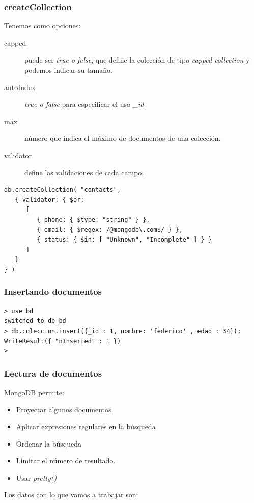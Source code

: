 \documentclass[4paper]{article}
\begin{document}
\subsubsection{createCollection}
Tenemos como opciones:
\begin{description}
\item[capped] puede ser \emph{true o false}, que define la colección de tipo \emph{capped collection} y podemos indicar su tamaño.
\item[autoIndex] \emph{true o false} para especificar el uso \emph{\_id}
\item[max] número que indica el máximo de documentos de una colección.
\item[validator] define las validaciones de cada campo.
\end{description}

\begin{lstlisting}
db.createCollection( "contacts",
   { validator: { $or:
      [
         { phone: { $type: "string" } },
         { email: { $regex: /@mongodb\.com$/ } },
         { status: { $in: [ "Unknown", "Incomplete" ] } }
      ]
   }
} )
\end{lstlisting}

\subsubsection{Insertando documentos}
\begin{lstlisting}
> use bd
switched to db bd
> db.coleccion.insert({_id : 1, nombre: 'federico' , edad : 34});
WriteResult({ "nInserted" : 1 })
> 
\end{lstlisting}

\newpage

\subsubsection{Lectura de documentos}
MongoDB permite:
\begin{itemize}
\item Proyectar algunos documentos.
\item Aplicar expresiones regulares en la búsqueda
\item Ordenar la búsqueda
\item Limitar el número de resultado.
\item Usar \emph{pretty()}
\end{itemize}

Los datos con lo que vamos a trabajar son:
\end{document}
